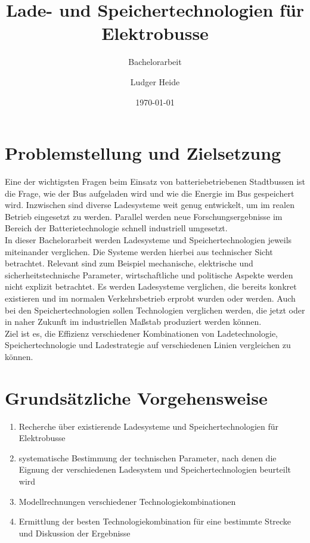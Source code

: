 \documentclass{scrartcl}
\title{Lade- und Speichertechnologien für Elektrobusse}
\subtitle{Bachelorarbeit}
\date{\today}
\author{Ludger Heide}
\begin{document}

\maketitle


\section*{Problemstellung und Zielsetzung}
Eine der wichtigsten Fragen beim Einsatz von batteriebetriebenen Stadtbussen ist die Frage, wie der Bus aufgeladen wird und wie die Energie im Bus gespeichert wird. Inzwischen sind diverse Ladesysteme weit genug entwickelt, um im realen Betrieb eingesetzt zu werden. Parallel werden neue Forschungsergebnisse im Bereich der Batterietechnologie schnell industriell umgesetzt.\\
In dieser Bachelorarbeit werden Ladesysteme und Speichertechnologien jeweils miteinander verglichen. Die Systeme werden hierbei aus technischer Sicht betrachtet. Relevant sind zum Beispiel mechanische, elektrische und sicherheitstechnische Parameter, wirtschaftliche und politische Aspekte werden nicht explizit betrachtet. Es werden Ladesysteme verglichen, die bereits konkret existieren und im normalen Verkehrsbetrieb erprobt wurden oder werden. Auch bei den Speichertechnologien sollen Technologien verglichen werden, die jetzt oder in naher Zukunft im industriellen Maßstab produziert werden können.\\
Ziel ist es, die Effizienz verschiedener Kombinationen von Ladetechnologie, Speichertechnologie und Ladestrategie auf verschiedenen Linien vergleichen zu können.

\section*{Grundsätzliche Vorgehensweise}
\begin{enumerate}
	\item Recherche über existierende Ladesysteme und Speichertechnologien für Elektrobusse
	\item systematische Bestimmung der technischen Parameter, nach denen die Eignung der verschiedenen Ladesystem und Speichertechnologien beurteilt wird
	\item Modellrechnungen verschiedener Technologiekombinationen %
	\item Ermittlung der besten Technologiekombination für eine bestimmte Strecke und Diskussion der Ergebnisse
\end{enumerate}


\end{document}
